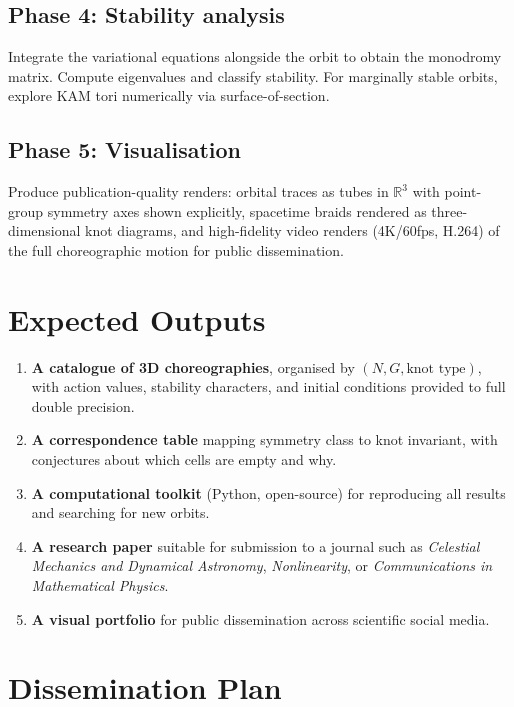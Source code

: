 \documentclass[12pt, a4paper]{article}
\theoremstyle{definition}
\newcommand{\R}{\mathbb{R}}
\begin{document}
\subsection{Phase 4: Stability analysis}

Integrate the variational equations alongside the orbit to obtain the
monodromy matrix. Compute eigenvalues and classify stability. For
marginally stable orbits, explore KAM tori numerically via surface-of-section.

\subsection{Phase 5: Visualisation}

Produce publication-quality renders: orbital traces as tubes in $\R^3$
with point-group symmetry axes shown explicitly, spacetime braids rendered
as three-dimensional knot diagrams, and high-fidelity video renders
(4K/60fps, H.264) of the full choreographic motion for public dissemination.

\section{Expected Outputs}

\begin{enumerate}[leftmargin=1.8em]
  \item \textbf{A catalogue of 3D choreographies}, organised by
        $(N, G, \text{knot type})$, with action values, stability
        characters, and initial conditions provided to full double
        precision.
  \item \textbf{A correspondence table} mapping symmetry class to knot
        invariant, with conjectures about which cells are empty and why.
  \item \textbf{A computational toolkit} (Python, open-source) for
        reproducing all results and searching for new orbits.
  \item \textbf{A research paper} suitable for submission to a journal
        such as \textit{Celestial Mechanics and Dynamical Astronomy},
        \textit{Nonlinearity}, or \textit{Communications in Mathematical Physics}.
  \item \textbf{A visual portfolio} for public dissemination across
        scientific social media.
\end{enumerate}

\section{Dissemination Plan}
\end{document}
